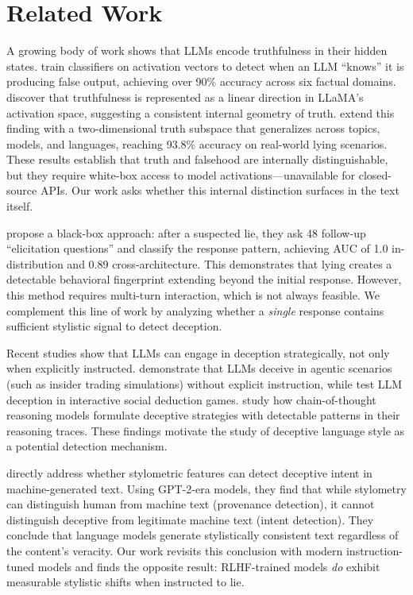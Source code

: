 \section{Related Work}
\label{sec:related}

A growing body of work shows that LLMs encode truthfulness in their hidden states.
\citet{azaria2023internal} train classifiers on activation vectors to detect when an LLM ``knows'' it is producing false output, achieving over 90\% accuracy across six factual domains.
\citet{marks2023geometry} discover that truthfulness is represented as a linear direction in LLaMA's activation space, suggesting a consistent internal geometry of truth.
\citet{burger2024truth} extend this finding with a two-dimensional truth subspace that generalizes across topics, models, and languages, reaching 93.8\% accuracy on real-world lying scenarios.
These results establish that truth and falsehood are internally distinguishable, but they require white-box access to model activations---unavailable for closed-source APIs.
Our work asks whether this internal distinction surfaces in the text itself.

\citet{pacchiardi2024catch} propose a black-box approach: after a suspected lie, they ask 48 follow-up ``elicitation questions'' and classify the response pattern, achieving AUC of 1.0 in-distribution and 0.89 cross-architecture.
This demonstrates that lying creates a detectable behavioral fingerprint extending beyond the initial response.
However, this method requires multi-turn interaction, which is not always feasible.
We complement this line of work by analyzing whether a \emph{single} response contains sufficient stylistic signal to detect deception.

Recent studies show that LLMs can engage in deception strategically, not only when explicitly instructed.
\citet{scheurer2023deception} demonstrate that LLMs deceive in agentic scenarios (such as insider trading simulations) without explicit instruction, while \citet{ogara2023hoodwinked} test LLM deception in interactive social deduction games.
\citet{wang2025thinking} study how chain-of-thought reasoning models formulate deceptive strategies with detectable patterns in their reasoning traces.
These findings motivate the study of deceptive language style as a potential detection mechanism.

\citet{schuster2019limitations} directly address whether stylometric features can detect deceptive intent in machine-generated text.
Using GPT-2-era models, they find that while stylometry can distinguish human from machine text (provenance detection), it cannot distinguish deceptive from legitimate machine text (intent detection).
They conclude that language models generate stylistically consistent text regardless of the content's veracity.
Our work revisits this conclusion with modern instruction-tuned models and finds the opposite result: RLHF-trained models \emph{do} exhibit measurable stylistic shifts when instructed to lie.

